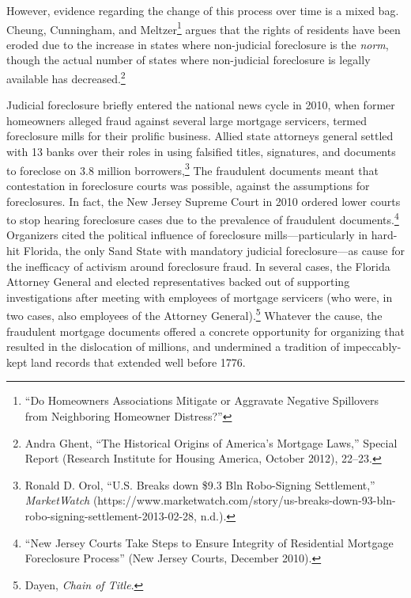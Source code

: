 \documentclass[12pt,oneside]{psthesis}
\begin{document}
However, evidence regarding the change of this process over time is a mixed bag.
Cheung, Cunningham, and Meltzer\footnote{``Do Homeowners Associations Mitigate or Aggravate Negative Spillovers from Neighboring Homeowner Distress?''} argues that the rights of residents have been eroded due to the increase in states where non-judicial foreclosure is the \emph{norm}, though the actual number of states where non-judicial foreclosure is legally available has decreased.\footnote{Andra Ghent, ``The Historical Origins of America's Mortgage Laws,'' Special Report (Research Institute for Housing America, October 2012), 22--23.}

Judicial foreclosure briefly entered the national news cycle in 2010, when former homeowners alleged fraud against several large mortgage servicers, termed foreclosure mills for their prolific business.
Allied state attorneys general settled with 13 banks over their roles in using falsified titles, signatures, and documents to foreclose on 3.8 million borrowers,\footnote{Ronald D. Orol, ``U.S. Breaks down \$9.3 Bln Robo-Signing Settlement,'' \emph{MarketWatch} (https://www.marketwatch.com/story/us-breaks-down-93-bln-robo-signing-settlement-2013-02-28, n.d.).}
The fraudulent documents meant that contestation in foreclosure courts was possible, against the assumptions for foreclosures.
In fact, the New Jersey Supreme Court in 2010 ordered lower courts to stop hearing foreclosure cases due to the prevalence of fraudulent documents.\footnote{``New Jersey Courts Take Steps to Ensure Integrity of Residential Mortgage Foreclosure Process'' (New Jersey Courts, December 2010).}
Organizers cited the political influence of foreclosure mills---particularly in hard-hit Florida, the only Sand State with mandatory judicial foreclosure---as cause for the inefficacy of activism around foreclosure fraud.
In several cases, the Florida Attorney General and elected representatives backed out of supporting investigations after meeting with employees of mortgage servicers (who were, in two cases, also employees of the Attorney General).\footnote{Dayen, \emph{Chain of Title}.}
Whatever the cause, the fraudulent mortgage documents offered a concrete opportunity for organizing that resulted in the dislocation of millions, and undermined a tradition of impeccably-kept land records that extended well before 1776.
\end{document}
